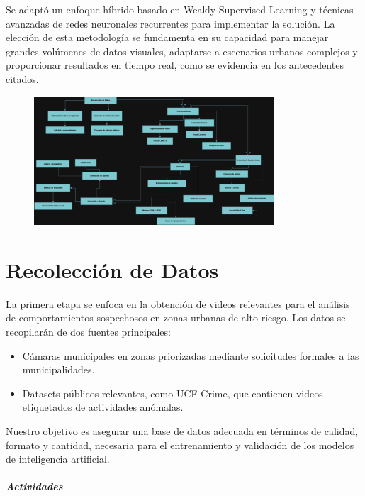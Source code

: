 \documentclass[listof=nochaptergap,12pt,times,authoryear]{report}
\begin{document}
Se adaptó un enfoque híbrido basado en Weakly Supervised Learning y técnicas avanzadas de redes neuronales recurrentes para implementar la solución. La elección de esta metodología se fundamenta en su capacidad para manejar grandes volúmenes de datos visuales, adaptarse a escenarios urbanos complejos y proporcionar resultados en tiempo real, como se evidencia en los antecedentes citados.


\begin{figure}[h] %
    \centering
    \includegraphics[width=0.8\textwidth]{propuesta.png} %
    \label{fig:ejemplo} %
\end{figure}

\section{Recolección de Datos}
La primera etapa se enfoca en la obtención de videos relevantes para el análisis de comportamientos sospechosos en zonas urbanas de alto riesgo. Los datos se recopilarán de dos fuentes principales:
\begin{itemize}
    \item Cámaras municipales en zonas priorizadas mediante solicitudes formales a las municipalidades.
    \item Datasets públicos relevantes, como UCF-Crime, que contienen videos etiquetados de actividades anómalas.
\end{itemize}
Nuestro objetivo es asegurar una base de datos adecuada en términos de calidad, formato y cantidad, necesaria para el entrenamiento y validación de los modelos de inteligencia artificial.

\paragraph{\textit{Actividades}}
\end{document}

